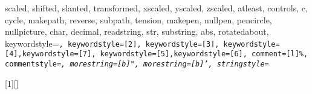{{        scaled, shifted, slanted, transformed, xscaled, yscaled, zscaled,%
        atleast, controls, c, cycle, makepath, reverse, subpath, tension,%
        makepen, nullpen, pencircle, nullpicture,%
    char, decimal, readstring, str, substring, abs, rotatedabout},%
    keywordstyle=\color{mpkeyword}\tt, keywordstyle=[2]\tt\color{mpinternalconstants},%
    keywordstyle=[3]\tt\color{mpdef}, keywordstyle=[4]\tt\color{mptype},keywordstyle=[7]\tt\color{mpdef},%
    keywordstyle=[5]\tt\color{mfcmd},keywordstyle=[6]\tt\color{mpexp},%
    comment=[l]{\%},%
    commentstyle=\it\small\color{texcomment},
    morestring=[b]",
    morestring=[b]',
    stringstyle=\color{mpstring}%
}


[1][]{}{}







\makeindex

